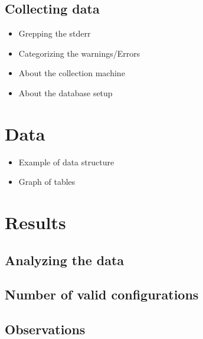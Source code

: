 \documentclass[a4paper,11pt]{article}
\begin{document}
\subsection{Collecting data}

\begin{itemize}
    \item Grepping the stderr
    \item Categorizing the warnings/Errors
    \item About the collection machine
    \item About the database setup
\end{itemize}




\newpage
\section{Data}

\begin{itemize}
    \item Example of data structure
    \item Graph of tables
\end{itemize}




\newpage
\section{Results}

\subsection{Analyzing the data}

\subsection{Number of valid configurations}

\subsection{Observations}
\end{document}
